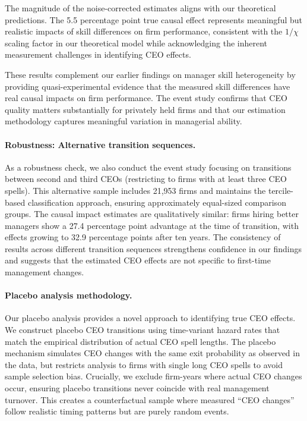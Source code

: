\documentclass[11pt,a4paper]{article}
\begin{document}
The magnitude of the noise-corrected estimates aligns with our theoretical predictions. The 5.5 percentage point true causal effect represents meaningful but realistic impacts of skill differences on firm performance, consistent with the $1/\chi$ scaling factor in our theoretical model while acknowledging the inherent measurement challenges in identifying CEO effects.

These results complement our earlier findings on manager skill heterogeneity by providing quasi-experimental evidence that the measured skill differences have real causal impacts on firm performance. The event study confirms that CEO quality matters substantially for privately held firms and that our estimation methodology captures meaningful variation in managerial ability.

\paragraph{Robustness: Alternative transition sequences.} As a robustness check, we also conduct the event study focusing on transitions between second and third CEOs (restricting to firms with at least three CEO spells). This alternative sample includes 21,953 firms and maintains the tercile-based classification approach, ensuring approximately equal-sized comparison groups. The causal impact estimates are qualitatively similar: firms hiring better managers show a 27.4 percentage point advantage at the time of transition, with effects growing to 32.9 percentage points after ten years. The consistency of results across different transition sequences strengthens confidence in our findings and suggests that the estimated CEO effects are not specific to first-time management changes.

\paragraph{Placebo analysis methodology.} Our placebo analysis provides a novel approach to identifying true CEO effects. We construct placebo CEO transitions using time-variant hazard rates that match the empirical distribution of actual CEO spell lengths. The placebo mechanism simulates CEO changes with the same exit probability as observed in the data, but restricts analysis to firms with single long CEO spells to avoid sample selection bias. Crucially, we exclude firm-years where actual CEO changes occur, ensuring placebo transitions never coincide with real management turnover. This creates a counterfactual sample where measured ``CEO changes'' follow realistic timing patterns but are purely random events.
\end{document}
